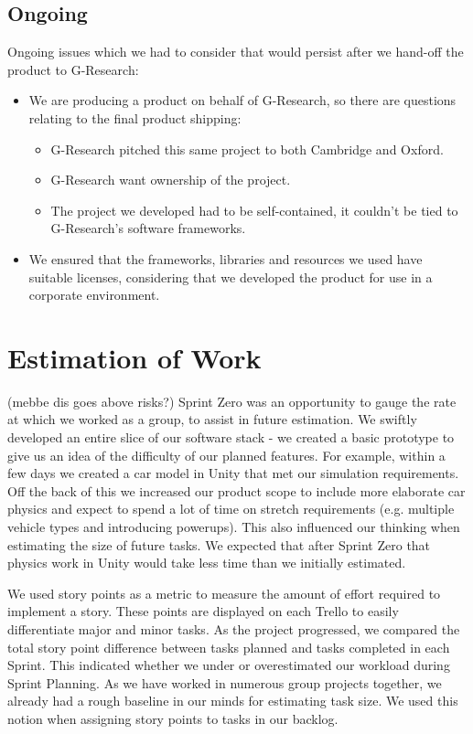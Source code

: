 \subsection{Ongoing}
Ongoing issues which we had to consider that would persist after we hand-off the product to G-Research:
\begin{itemize}
\item We are producing a product on behalf of G-Research, so there are questions relating to the final product shipping:
\begin{itemize}
\item G-Research pitched this same project to both Cambridge and Oxford.
\item G-Research want ownership of the project.
\item The project we developed had to be self-contained, it couldn't be tied to G-Research's software frameworks.
\end{itemize}
\item We ensured that the frameworks, libraries and resources we used have suitable licenses, considering that we developed the product for use in a corporate environment.
\end{itemize}

\section{Estimation of Work}
(mebbe dis goes above risks?)
Sprint Zero was an opportunity to gauge the rate at which we worked as a group, to assist in future estimation. We swiftly developed an entire slice of our software stack - we created a basic prototype to give us an idea of the difficulty of our planned features. For example, within a few days we created a car model in Unity that met our simulation requirements. Off the back of this we increased our product scope to include more elaborate car physics and expect to spend a lot of time on stretch requirements (e.g. multiple vehicle types and introducing powerups). This also influenced our thinking when estimating the size of future tasks. We expected that after Sprint Zero that physics work in Unity would take less time than we initially estimated.

We used story points as a metric to measure the amount of effort required to implement a story. These points are displayed on each Trello to easily differentiate major and minor tasks. As the project progressed, we compared the total story point difference between tasks planned and tasks completed in each Sprint. This indicated whether we under or overestimated our workload during Sprint Planning. As we have worked in numerous group projects together, we already had a rough baseline in our minds for estimating task size. We used this notion when assigning story points to tasks in our backlog.

